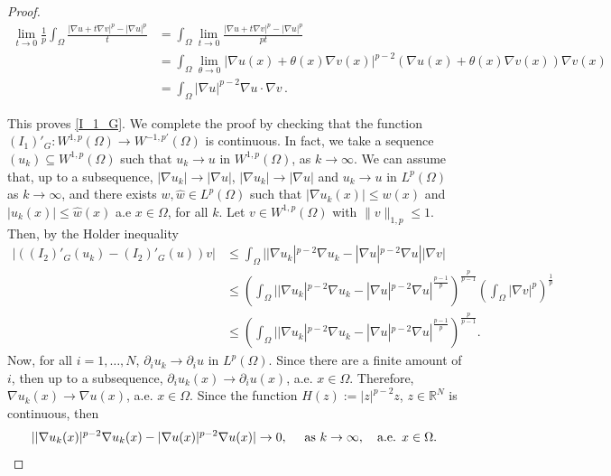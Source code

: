 \documentclass[pdflatex,sn-mathphys-num]{sn-jnl}
\theoremstyle{thmstyleone}%
\theoremstyle{thmstyletwo}%
\theoremstyle{thmstylethree}%
\theoremstyle{thmstylethree}%
\begin{document}
\begin{proof}
    \begin{align*}
        \lim_{t\to 0}\frac{1}{p}\int_{\Omega}\frac{|\nabla u+t\nabla v|^p-|\nabla u|^p}{t}&= \int_{\Omega}\lim_{t\to 0}\frac{|\nabla u+t\nabla v|^p-|\nabla u|^p}{pt} \nonumber \\&=\int_{\Omega}\lim_{\theta\to 0}|\nabla u(x)+\theta(x)\nabla v(x)|^{p-2}(\nabla u(x)+\theta(x)\nabla v(x)) \nabla v(x) \nonumber \\&=\int_{\Omega} |\nabla u|^{p-2} \nabla u\cdot\nabla v  \,.
\end{align*}

This proves \eqref{I_1_G}.
We complete the proof by checking that the function $(I_1)'_G: W^{1,p}(\Omega)\to W^{-1,p'}(\Omega)$ is continuous. In fact, we take a sequence $(u_k)\subseteq W^{1,p}(\Omega)$ such that $u_k\to u$ in $W^{1,p}(\Omega)$, as $k\to \infty$. 
We can assume that, up to a subsequence, $|\nabla u_k|\to|\nabla u|$, $|\nabla u_k|\to |\nabla u|$ and $u_k\to u$ in $L^p(\Omega)$ as $k\to \infty$, and there exists $w, \hat{w}\in L^p(\Omega)$ such that $|\nabla u_k(x)|\leqslant w(x)$ and $ |u_k(x)|\leqslant \hat{w}(x)$ a.e $x\in \Omega$, for all $k$. Let $v\in W^{1,p}(\Omega)$ with $\|v\|_{1,p}\leqslant 1$. Then, by the Holder inequality
    \begin{align}\label{cont_gate_2}
        |((I_2)'_G(u_k)-(I_2)'_G(u))v| & \leqslant \int_\Omega ||\nabla u_k|^{p-2}\nabla u_k - |\nabla u|^{p-2}\nabla u||\nabla v| \nonumber \\
        & \leqslant \left( \int_\Omega ||\nabla u_k|^{p-2}\nabla u_k - |\nabla u|^{p-2}\nabla u|^{\frac{p-1}{p}}  \right)^{\frac{p}{p-1}}\left(\int_\Omega |\nabla v|^p \right)^\frac{1}{p} 
        \nonumber \\
        & \leqslant \left( \int_\Omega ||\nabla u_k|^{p-2}\nabla u_k - |\nabla u|^{p-2}\nabla u|^{\frac{p-1}{p}}  \right)^{\frac{p}{p-1}}.
        \end{align}
Now, for all $i=1, \dots, N$, $\partial_i u_k \to \partial_i u$ in $L^{p}(\Omega)$. Since there are a finite amount of $i$, then up to a subsequence, $\partial_i u_k(x) \to \partial_i u(x)$, a.e. $x\in \Omega$. Therefore, $\nabla u_k(x) \to \nabla u(x)$, a.e. $x\in \Omega$. Since the function $H(z):=|z|^{p-2}z$, $z\in \mathbb{R}^N$ is continuous, then \begin{equation}\label{nabla_uv_5}
    ||\nabla u_k(x)|^{p-2}\nabla u_k(x) - |\nabla u(x)|^{p-2}\nabla u(x)| \to 0, \quad \hbox{ as } k\to \infty , \quad \text{a.e. } x\in \Omega .
\end{equation}

\end{proof}
\end{document}

